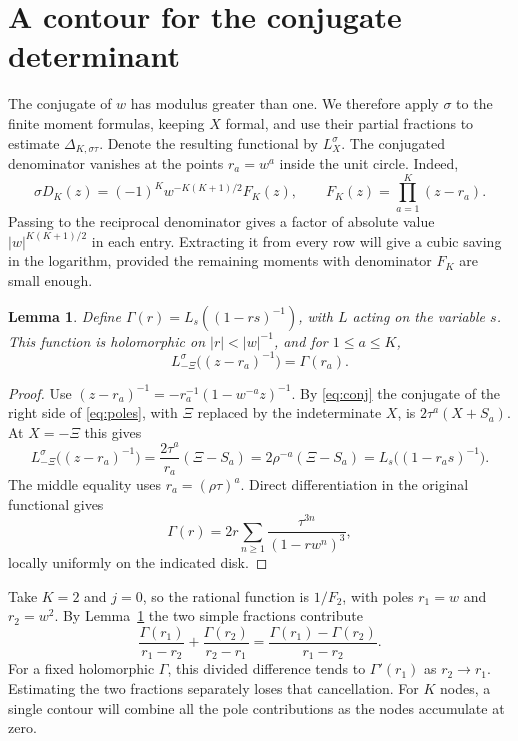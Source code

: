 \documentclass[11pt,letterpaper]{article}
\newtheorem{lemma}[theorem]{Lemma}
\numberwithin{equation}{section}
\begin{document}
\section{A contour for the conjugate determinant}\label{sec:second}

The conjugate of \(w\) has modulus greater than one. We therefore
apply \(\sigma\) to the finite moment formulas, keeping \(X\) formal,
and use their partial fractions to estimate \(\Delta_{K,\sigma\tau}\).
Denote the resulting functional by \(L_X^\sigma\). The conjugated
denominator vanishes at the points \(r_a=w^a\) inside the unit circle.
Indeed,
\begin{equation}\label{eq:denconj}
 \sigma D_K(z)=(-1)^K w^{-K(K+1)/2}F_K(z),\qquad
 F_K(z)=\prod_{a=1}^K(z-r_a).
\end{equation}
Passing to the reciprocal denominator gives a factor of absolute
value \(|w|^{K(K+1)/2}\) in each entry. Extracting it from every row
will give a cubic saving in the logarithm, provided the remaining
moments with denominator \(F_K\) are small enough.

\begin{lemma}\label{lem:gamma}
Define \(\Gamma(r)=L_s((1-rs)^{-1})\), with \(L\) acting on the
variable \(s\). This function is holomorphic on \(|r|<|w|^{-1}\),
and for \(1\le a\le K\),
\[
                   L^\sigma_{-\Xi}\big((z-r_a)^{-1}\big)=\Gamma(r_a).
\]
\end{lemma}
\begin{proof}
Use \((z-r_a)^{-1}=-r_a^{-1}(1-w^{-a}z)^{-1}\). By
\eqref{eq:conj} the conjugate of the right side of
\eqref{eq:poles}, with \(\Xi\) replaced by the indeterminate \(X\),
is \(2\tau^a(X+S_a)\). At \(X=-\Xi\) this gives
\[
 L^\sigma_{-\Xi}\big((z-r_a)^{-1}\big)
   =\frac{2\tau^a}{r_a}(\Xi-S_a)
   =2\rho^{-a}(\Xi-S_a)
   =L_s\big((1-r_a s)^{-1}\big).
\]
The middle equality uses \(r_a=(\rho\tau)^a\). Direct differentiation
in the original functional gives
\[
                 \Gamma(r)=2r\sum_{n\ge1}
                       \frac{\tau^{3n}}{(1-rw^n)^3},
\]
locally uniformly on the indicated disk.
\end{proof}

Take \(K=2\) and \(j=0\), so the rational function is \(1/F_2\),
with poles \(r_1=w\) and \(r_2=w^2\). By Lemma~\ref{lem:gamma} the
two simple fractions contribute
\[
  \frac{\Gamma(r_1)}{r_1-r_2}+\frac{\Gamma(r_2)}{r_2-r_1}
     =\frac{\Gamma(r_1)-\Gamma(r_2)}{r_1-r_2}.
\]
For a fixed holomorphic \(\Gamma\), this divided difference tends to
\(\Gamma'(r_1)\) as \(r_2\to r_1\). Estimating the two fractions
separately loses that cancellation. For \(K\) nodes, a single contour
will combine all the pole contributions as the nodes accumulate at zero.
\end{document}
